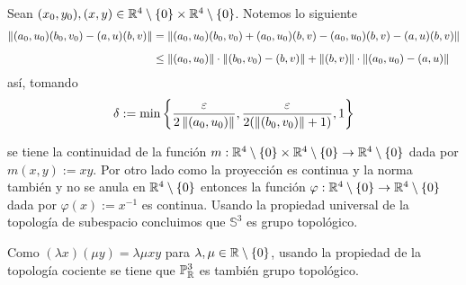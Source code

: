\documentclass{article}
\begin{document}
\vspace{2mm}
\noindent Sean $(x_{0},y_{0}),(x,y)\in\mathbb{R}^{4}\setminus\{0\}\times\mathbb{R}^{4}\setminus\{0\}$. Notemos lo 
siguiente
\begin{align*}
    \left \lVert (a_{0},u_{0})(b_{0},v_{0})-(a,u)(b,v)\right \rVert &= \left \lVert (a_{0},u_{0})(b_{0},v_{0})
    +(a_{0},u_{0})(b,v)-(a_{0},u_{0})(b,v)-(a,u)(b,v)\right \rVert \\[2mm]
    &\leq \left \lVert (a_{0},u_{0})\right \rVert\cdot\left \lVert (b_{0},v_{0})-(b,v)\right \rVert
    +\left \lVert (b,v)\right \rVert\cdot\left \lVert (a_{0},u_{0})-(a,u)\right \rVert
\end{align*}
así, tomando
\begin{equation*}
    \delta:=\min\left\{\frac{\varepsilon}{2\left \lVert (a_{0},u_{0})\right \rVert},
    \frac{\varepsilon}{2(\left \lVert (b_{0},v_{0})\right \rVert+1)},1\right\}
\end{equation*}

\vspace{2mm}
\noindent se tiene la continuidad de la función $m:\mathbb{R}^{4}\setminus\{0\}\times\mathbb{R}^{4}\setminus\{0\}
\to\mathbb{R}^{4}\setminus\{0\}$ dada por $m(x,y):=xy$. Por otro lado como la proyección es continua y la
norma también y no se anula en $\mathbb{R}^{4}\setminus\{0\}$ entonces la función $\varphi:
\mathbb{R}^{4}\setminus\{0\}\to\mathbb{R}^{4}\setminus\{0\}$ dada por $\varphi(x):=x^{-1}$ es continua. Usando la
propiedad universal de la topología de subespacio concluimos que $\mathbb{S}^{3}$ es grupo 
topológico.

\vspace{2mm}
\noindent Como $(\lambda x)(\mu y)=\lambda\mu xy$ para $\lambda,\mu\in\mathbb{R}\setminus\{0\}$, usando la
propiedad de la topología cociente se tiene que $\mathbb{P}_{\mathbb{R}}^{3}$ es también grupo topológico.

\end{document}
